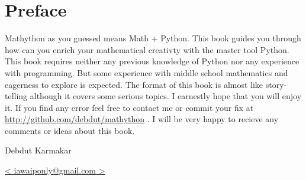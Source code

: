 \chapter*{Preface}

Mathython as you guessed means Math + Python. This book guides you through how can you enrich your mathematical creativty
with the master tool Python. This book requires neither any previous knowledge of Python nor any experience with 
programming. But some experience with middle school mathematics and eagerness to explore is expected. The format of this
book is almost like story-telling although it covers some serious topics. I earnestly hope that you will enjoy it. If 
you find any error feel free to contact me or commit your fix at \url{http://github.com/debdut/mathython} . I will be
very happy to recieve any comments or ideas about this book.

\begin{flushright}

Debdut Karmakar \hspace{0.2in}

\href{mailto:iawaiponly@gmail.com}{< iawaiponly@gmail.com >}

\end{flushright}